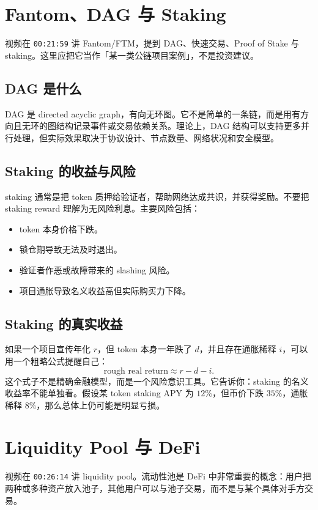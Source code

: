 \documentclass[UTF8,11pt]{ctexart}
\newcommand{\timestamp}[1]{\textcolor{blue!50!black}{\texttt{#1}}}
\begin{document}
\section{Fantom、DAG 与 Staking}

视频在 \timestamp{00:21:59} 讲 Fantom/FTM，提到 DAG、快速交易、Proof of Stake 与 staking。这里应把它当作「某一类公链项目案例」，不是投资建议。

\subsection{DAG 是什么}

DAG 是 directed acyclic graph，有向无环图。它不是简单的一条链，而是用有方向且无环的图结构记录事件或交易依赖关系。理论上，DAG 结构可以支持更多并行处理，但实际效果取决于协议设计、节点数量、网络状况和安全模型。

\subsection{Staking 的收益与风险}

staking 通常是把 token 质押给验证者，帮助网络达成共识，并获得奖励。不要把 staking reward 理解为无风险利息。主要风险包括：
\begin{itemize}
  \item token 本身价格下跌。
  \item 锁仓期导致无法及时退出。
  \item 验证者作恶或故障带来的 slashing 风险。
  \item 项目通胀导致名义收益高但实际购买力下降。
\end{itemize}

\subsection{Staking 的真实收益}

如果一个项目宣传年化 \(r\)，但 token 本身一年跌了 \(d\)，并且存在通胀稀释 \(i\)，可以用一个粗略公式提醒自己：
\[
\text{rough real return} \approx r - d - i.
\]
这个式子不是精确金融模型，而是一个风险意识工具。它告诉你：staking 的名义收益率不能单独看。假设某 token staking APY 为 \(12\%\)，但币价下跌 \(35\%\)，通胀稀释 \(8\%\)，那么总体上仍可能是明显亏损。

\section{Liquidity Pool 与 DeFi}
\label{sec:defi}

视频在 \timestamp{00:26:14} 讲 liquidity pool。流动性池是 DeFi 中非常重要的概念：用户把两种或多种资产放入池子，其他用户可以与池子交易，而不是与某个具体对手方交易。
\end{document}
